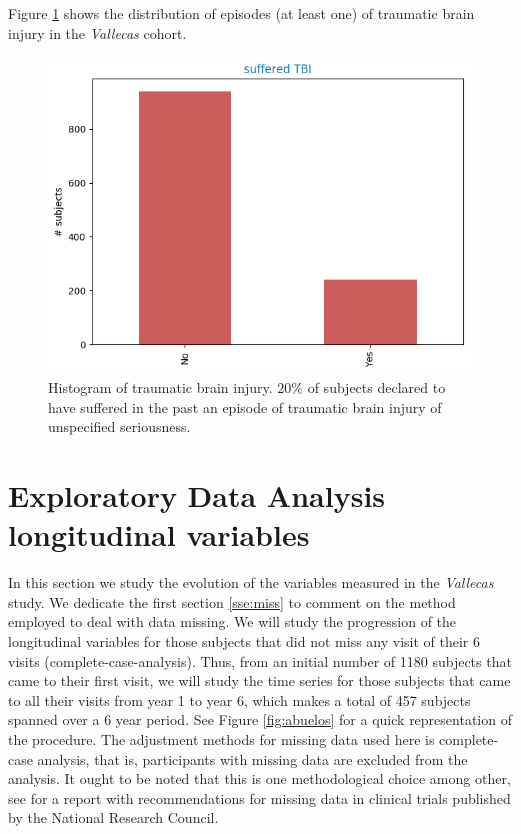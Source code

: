 \documentclass[11pt]{article}
\theoremstyle{definition}
\theoremstyle{remark}
\begin{document}
Figure \ref{fig:tce} shows the distribution of episodes (at least one) of traumatic brain injury in the \emph{Vallecas} cohort. 

\begin{figure}[!htb]
        \centering
        \includegraphics[keepaspectratio, width=0.6\linewidth]{figures/Fig_tce}
        \caption{Histogram of traumatic brain injury. $20\%$ of subjects declared to have suffered in the past an episode of traumatic brain injury of unspecified seriousness.} 
        \label{fig:tce}
\end{figure}

\section{Exploratory Data Analysis longitudinal variables}
\label{se:eda_long}
In this section we study the evolution of the variables measured in the \emph{Vallecas} study. We dedicate the first section \ref{sse:miss} to comment on the method employed to deal with data missing. 
We will study the progression of the longitudinal variables for those subjects that did not miss any visit of their 6 visits (complete-case-analysis). Thus, from an initial number of 1180 subjects that came to their first visit, we will study the time series for those subjects that came to all their visits from year 1 to year 6, which makes a total of 457 subjects spanned over a 6 year period. See Figure \ref{fig:abuelos} for a quick  representation of the procedure.
The adjustment methods for missing data used here is complete-case analysis, that is, participants with missing data are excluded from the analysis. It ought to be noted that this is one methodological choice among other, see \cite{national2010prevention} for a report with recommendations for missing data in clinical trials published by the National Research Council. 
\end{document}
